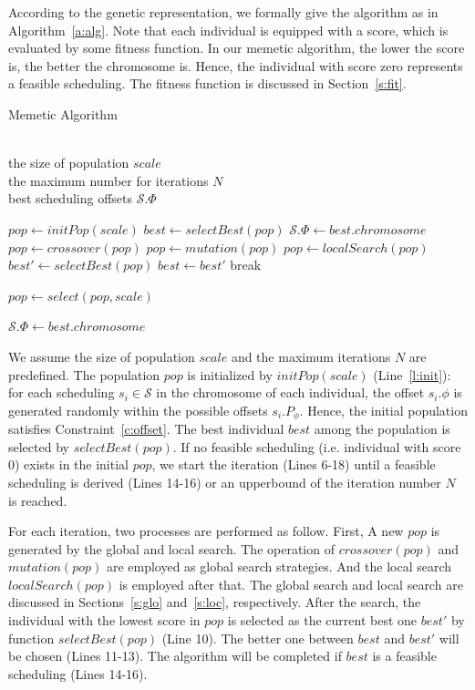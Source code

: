 \documentclass[10pt,journal]{IEEEtran}
\newcommand{\calS}{\mathcal{S}}
\theoremstyle{remark}
\begin{document}
According to the genetic representation, we formally give the algorithm as in Algorithm~\ref{a:alg}. 
Note that each individual is equipped with a score, which is evaluated by some fitness function.
In our memetic algorithm,
the lower the score is, the better the chromosome is.
Hence,
the individual with score zero represents a feasible scheduling.
The fitness function is discussed in Section~\ref{s:fit}.
\begin{algorithm}[tb]
	\caption{Memetic Algorithm}
	\label{a:alg}
	\renewcommand{\algorithmicrequire}{\textbf{Input:}}
	\renewcommand{\algorithmicensure}{\textbf{Output:}}
	\begin{algorithmic}[1]
		\REQUIRE~~\\
		the size of population $scale$\\
		the maximum number for iterations $N$
		\ENSURE~~\\
		best scheduling offsets $\calS.\Phi$
		
		\STATE $pop \gets initPop(scale)$ \label{l:init}
		\STATE $best \gets selectBest(pop)$
		\RETURN $\calS.\Phi \gets best.chromosome$
		\ENDIF
		\STATE $pop \gets crossover(pop)$
		\STATE $pop \gets mutation(pop)$
		\STATE $pop \gets localSearch(pop)$
		\STATE $best' \gets selectBest(pop)$
		\STATE $best \gets best'$
		\ENDIF    
		\STATE break
		\ENDIF
		
		\STATE $pop \gets select(pop, scale)$
		\ENDFOR
		
		\RETURN $\calS.\Phi \gets best.chromosome$
	\end{algorithmic}
\end{algorithm}	

We assume the size of population $scale$ and the maximum iterations $N$ are predefined.
The population $pop$ is initialized by $initPop(scale)$ (Line~\ref{l:init}):
for each scheduling $s_{i}\in\calS$ in the chromosome of each individual,
 the offset $s_i.\phi$ is generated randomly within the possible offsets $s_i.P_\phi$.
Hence,
 the initial population satisfies Constraint~\ref{c:offset}.
The best individual $best$ among the population is selected by $selectBest(pop)$.
If no feasible scheduling (i.e. individual with score 0) exists in the initial $pop$, 
we start the iteration (Lines 6-18) until a feasible scheduling is derived (Lines 14-16) or an upperbound of the iteration number $N$ is reached.

For each iteration, two processes are performed as follow.
First, A new $pop$ is generated by the global and local search.
The operation of $crossover(pop)$ and $mutation(pop)$ are employed as global search strategies.
And the local search $localSearch(pop)$ is employed after that.
The global search and local search are discussed in Sections~\ref{s:glo} and~\ref{s:loc}, respectively.
After the search, the individual with the lowest score in $pop$ is selected as the current best one $best'$ by function $selectBest(pop)$ (Line 10).
The better one between $best$ and $best'$ will be chosen (Lines 11-13).
The algorithm will be completed if $best$ is a feasible scheduling (Lines 14-16).
\end{document}
